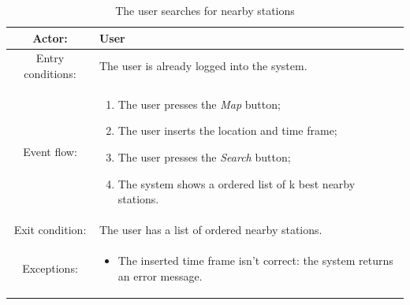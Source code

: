 \begin{table}[h]
    \begin{center}
        \begin{tabular}{|c||p{10cm}|}
            \hline
            Actor:            & User                                            \\
            \hline
            Entry conditions: & The user is already logged into the system.     \\
            \hline
            Event flow:       &
            \begin{enumerate}
                \item The user presses the \textit{Map} button;
                \item The user inserts the location and time frame;
                \item The user presses the \textit{Search} button;
                \item The system shows a ordered list of k best nearby stations.
            \end{enumerate}
            \\
            \hline
            Exit condition:   & The user has a list of ordered nearby stations. \\
            \hline
            Exceptions:       &
            \begin{itemize}
                \item The inserted time frame isn't correct: the system returns an error message.
            \end{itemize}
            \\
            \hline
        \end{tabular}
    \end{center}
    \caption{The user searches for nearby stations}
\end{table}

